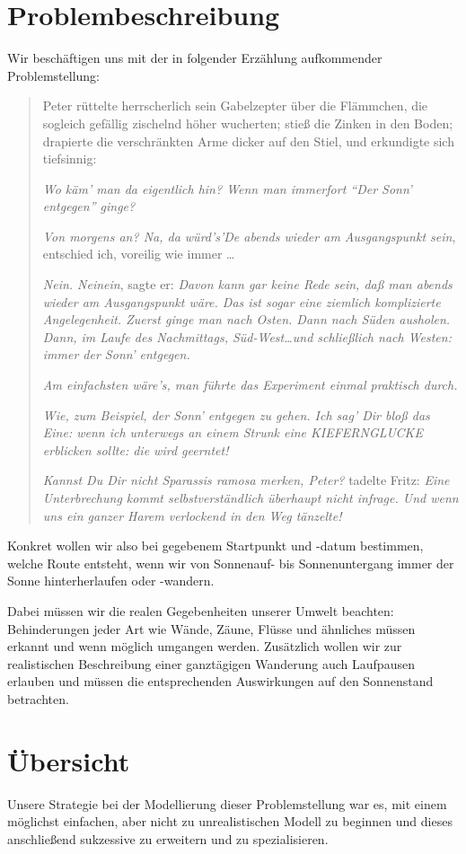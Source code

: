 \documentclass[
    paper=a4,
    DIV14,
    fontsize=12pt,
    pagesize=pdftex,
    toc=bibliographynumbered
]{scrartcl}
\numberwithin{figure}{section}
\numberwithin{equation}{section}
\numberwithin{table}{section}
\begin{document}
\section{Problembeschreibung}
Wir beschäftigen uns mit der in folgender Erzählung aufkommender Problemstellung:
\blockquote{
    Peter rüttelte herrscherlich sein Gabelzepter über die Flämmchen, die sogleich gefällig
    zischelnd höher wucherten; stieß die Zinken in den Boden; drapierte die verschränkten
    Arme dicker auf den Stiel, und erkundigte sich tiefsinnig:

    \textit{Wo käm' man da eigentlich hin? Wenn man immerfort \enquote{Der Sonn' entgegen}
    ginge?}

    \textit{Von morgens an? Na, da würd's'De abends wieder am Ausgangspunkt sein},
    entschied ich, voreilig wie immer \dots

    \textit{Nein. Neinein}, sagte er: \textit{Davon kann gar keine Rede sein, daß man
    abends wieder am Ausgangspunkt wäre. Das ist sogar eine ziemlich komplizierte
    Angelegenheit. Zuerst ginge man nach Osten. Dann nach Süden ausholen. Dann, im Laufe
    des Nachmittags, Süd-West…und schließlich nach Westen: immer der Sonn' entgegen.}

    \textit{Am einfachsten wäre's, man führte das Experiment einmal praktisch durch.}

    \textit{Wie, zum Beispiel, der Sonn' entgegen zu gehen. Ich sag' Dir bloß das Eine:
    wenn ich unterwegs an einem Strunk eine KIEFERNGLUCKE erblicken sollte: die wird
    geerntet!}

    \textit{Kannst Du Dir nicht Sparassis ramosa merken, Peter?} tadelte Fritz:
    \textit{Eine Unterbrechung kommt selbstverständlich überhaupt nicht infrage. Und wenn
    uns ein ganzer Harem verlockend in den Weg tänzelte!}
}
Konkret wollen wir also bei gegebenem Startpunkt und -datum bestimmen, welche Route
entsteht, wenn wir von Sonnenauf- bis Sonnenuntergang immer der Sonne  hinterherlaufen
oder -wandern.

Dabei müssen wir die realen Gegebenheiten unserer Umwelt beachten:
Behinderungen jeder Art wie Wände, Zäune, Flüsse und ähnliches müssen erkannt und wenn
möglich umgangen werden.
Zusätzlich wollen wir zur realistischen Beschreibung einer ganztägigen Wanderung auch
Laufpausen erlauben und müssen die entsprechenden Auswirkungen auf den Sonnenstand
betrachten.

\section{Übersicht}
Unsere Strategie bei der Modellierung dieser Problemstellung war es, mit einem möglichst
einfachen, aber nicht zu unrealistischen Modell zu beginnen und dieses anschließend
sukzessive zu erweitern und zu spezialisieren.
\end{document}
